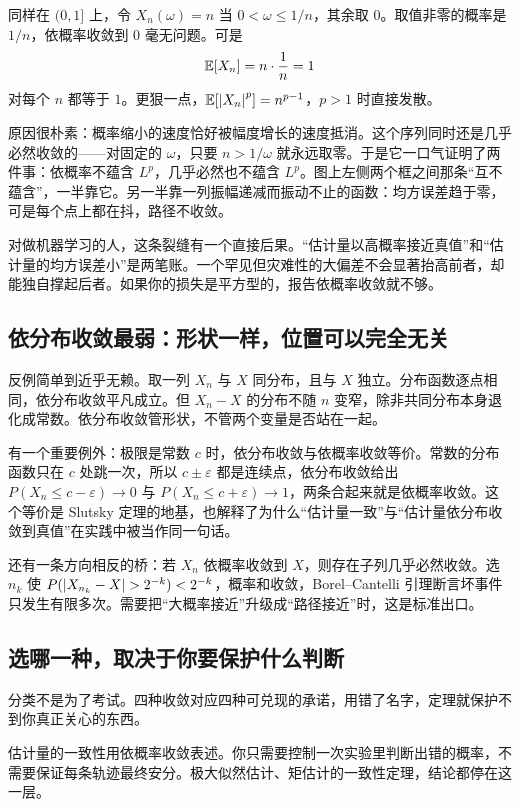 同样在 \((0,1]\) 上，令 \(X_n(\omega)=n\) 当 \(0<\omega\le1/n\)，其余取 \(0\)。取值非零的概率是 \(1/n\)，依概率收敛到 \(0\) 毫无问题。可是
\[
\mathbb{E}[X_n]=n\cdot\frac1n=1
\]
对每个 \(n\) 都等于 \(1\)。更狠一点，\(\mathbb{E}[\left|X_n\right|^p]=n^{p-1}\)，\(p>1\) 时直接发散。

原因很朴素：概率缩小的速度恰好被幅度增长的速度抵消。这个序列同时还是几乎必然收敛的——对固定的 \(\omega\)，只要 \(n>1/\omega\) 就永远取零。于是它一口气证明了两件事：依概率不蕴含 \(L^p\)，几乎必然也不蕴含 \(L^p\)。图上左侧两个框之间那条``互不蕴含''，一半靠它。另一半靠一列振幅递减而振动不止的函数：均方误差趋于零，可是每个点上都在抖，路径不收敛。

对做机器学习的人，这条裂缝有一个直接后果。``估计量以高概率接近真值''和``估计量的均方误差小''是两笔账。一个罕见但灾难性的大偏差不会显著抬高前者，却能独自撑起后者。如果你的损失是平方型的，报告依概率收敛就不够。

\subsection{依分布收敛最弱：形状一样，位置可以完全无关}

反例简单到近乎无赖。取一列 \(X_n\) 与 \(X\) 同分布，且与 \(X\) 独立。分布函数逐点相同，依分布收敛平凡成立。但 \(X_n-X\) 的分布不随 \(n\) 变窄，除非共同分布本身退化成常数。依分布收敛管形状，不管两个变量是否站在一起。

有一个重要例外：极限是常数 \(c\) 时，依分布收敛与依概率收敛等价。常数的分布函数只在 \(c\) 处跳一次，所以 \(c\pm\varepsilon\) 都是连续点，依分布收敛给出 \(P(X_n\le c-\varepsilon)\to0\) 与 \(P(X_n\le c+\varepsilon)\to1\)，两条合起来就是依概率收敛。这个等价是 Slutsky 定理的地基，也解释了为什么``估计量一致''与``估计量依分布收敛到真值''在实践中被当作同一句话。

还有一条方向相反的桥：若 \(X_n\) 依概率收敛到 \(X\)，则存在子列几乎必然收敛。选 \(n_k\) 使 \(P(\abs{X_{n_k}-X}>2^{-k})<2^{-k}\)，概率和收敛，Borel--Cantelli 引理断言坏事件只发生有限多次。需要把``大概率接近''升级成``路径接近''时，这是标准出口。

\subsection{选哪一种，取决于你要保护什么判断}

分类不是为了考试。四种收敛对应四种可兑现的承诺，用错了名字，定理就保护不到你真正关心的东西。

估计量的一致性用依概率收敛表述。你只需要控制一次实验里判断出错的概率，不需要保证每条轨迹最终安分。极大似然估计、矩估计的一致性定理，结论都停在这一层。

